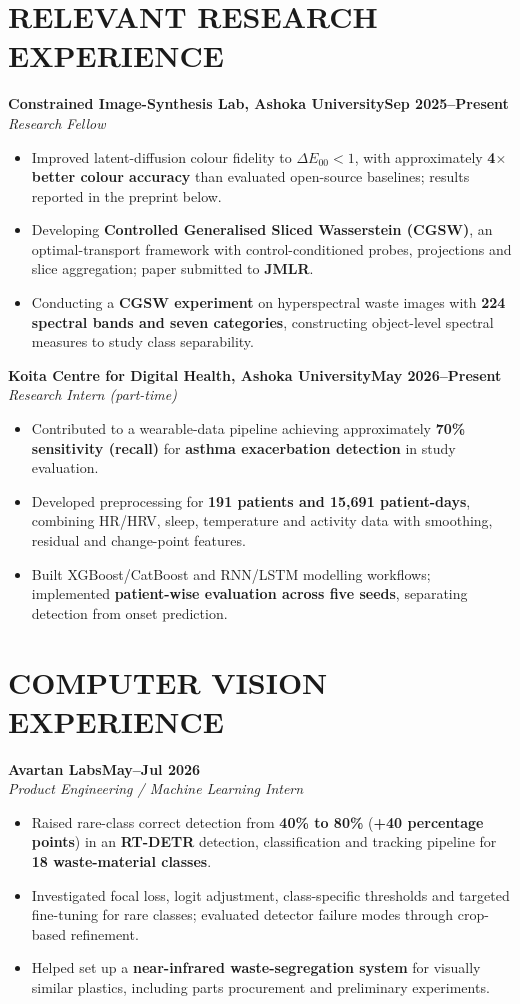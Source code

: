 \documentclass[10pt,a4paper]{article}
\newcommand{\entry}[3]{\noindent\textbf{#1}\hfill\textbf{#3}\\[-1pt]\textit{#2}\par}
\newenvironment{cvitems}{\begin{itemize}[leftmargin=1.1em,label=\textbullet,itemsep=2pt,topsep=3pt,parsep=0pt,partopsep=0pt]}{\end{itemize}}
\begin{document}
\section{RELEVANT RESEARCH EXPERIENCE}
\entry{Constrained Image-Synthesis Lab, Ashoka University}{Research Fellow}{Sep 2025--Present}
\begin{cvitems}
  \item Improved latent-diffusion colour fidelity to $\Delta E_{00}<1$, with approximately \textbf{4$\times$ better colour accuracy} than evaluated open-source baselines; results reported in the preprint below.
  \item Developing \textbf{Controlled Generalised Sliced Wasserstein (CGSW)}, an optimal-transport framework with control-conditioned probes, projections and slice aggregation; paper submitted to \textbf{JMLR}.
  \item Conducting a \textbf{CGSW experiment} on hyperspectral waste images with \textbf{224 spectral bands and seven categories}, constructing object-level spectral measures to study class separability.
\end{cvitems}
\entry{Koita Centre for Digital Health, Ashoka University}{Research Intern (part-time)}{May 2026--Present}
\begin{cvitems}
  \item Contributed to a wearable-data pipeline achieving approximately \textbf{70\% sensitivity (recall)} for \textbf{asthma exacerbation detection} in study evaluation.
  \item Developed preprocessing for \textbf{191 patients and 15,691 patient-days}, combining HR/HRV, sleep, temperature and activity data with smoothing, residual and change-point features.
  \item Built XGBoost/CatBoost and RNN/LSTM modelling workflows; implemented \textbf{patient-wise evaluation across five seeds}, separating detection from onset prediction.
\end{cvitems}
\section{COMPUTER VISION EXPERIENCE}
\entry{Avartan Labs}{Product Engineering / Machine Learning Intern}{May--Jul 2026}
\begin{cvitems}
  \item Raised rare-class correct detection from \textbf{40\% to 80\%} (\textbf{+40 percentage points}) in an \textbf{RT-DETR} detection, classification and tracking pipeline for \textbf{18 waste-material classes}.
  \item Investigated focal loss, logit adjustment, class-specific thresholds and targeted fine-tuning for rare classes; evaluated detector failure modes through crop-based refinement.
  \item Helped set up a \textbf{near-infrared waste-segregation system} for visually similar plastics, including parts procurement and preliminary experiments.
\end{cvitems}
\end{document}
